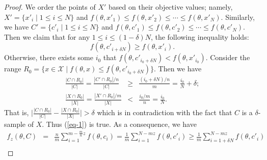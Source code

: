 \documentclass{article}
\begin{document}
\begin{proof}
We order the points of $X'$ based on their objective values; namely, $X'=\{x'_i\mid 1\leq i\leq N\}$ and $f(\theta, x'_1)\leq f(\theta, x'_2)\leq\cdots\leq f(\theta, x'_N)$. Similarly, we have $C'=\{c'_i\mid 1\leq i\leq N\}$ and $f(\theta, c'_1)\leq f(\theta, c'_2)\leq\cdots\leq f(\theta, c'_N)$. Then we claim that for any $ 1\leq i\leq (1-\delta)N $, the following inequality holds: 
\begin{equation}\label{eq-1}
    f(\theta,c'_{i+\delta N})\geq f(\theta,x'_{i}). 
\end{equation}
Otherwise,  there exists some $i_0$ that 
%
%
%
$ f(\theta,c'_{i_0+\delta N})< f(\theta,x'_{i_0}) $. Consider the range $R_0=\{x\in \mathcal{X}\mid f(\theta,x)\leq f(\theta,c'_{i_0+\delta N})  \} $. Then we have
%
%
\begin{eqnarray}
	\frac{|C\cap R_0|}{|C|}=\frac{|C'\cap R_0|/n}{|C|}&\geq& \frac{(i_0+\delta N)/n}{m}=\frac{i_0}{N}+\delta; \\
	\frac{|X\cap R_0|}{|X|}=\frac{|X'\cap R_0 | /m}{|X|}&<&\frac{i_0/m}{n}=\frac{i_0}{N}. 
\end{eqnarray}
That is, $\big|\frac{|C\cap R_0|}{|C|}-\frac{|X\cap R_0|}{|X|}\big|>\delta$ which is in  contradiction with the fact that $ C $ is a $ \delta $-sample of $ X $. Thus (\ref{eq-1}) is true. As a consequence, we have
\begin{eqnarray}
	{f}_{z}(\theta,C)&=&\frac{n}{m}\sum_{i=1}^{m-\frac{m}{n}z}f(\theta,c_i) = \frac{1}{m}\sum_{i=1}^{N-mz}f(\theta,c'_i)  \geq \frac{1}{m}\sum_{i=1+\delta N}^{N-mz}f(\theta,c'_i)   \\

\end{eqnarray}
\end{proof}
\end{document}
